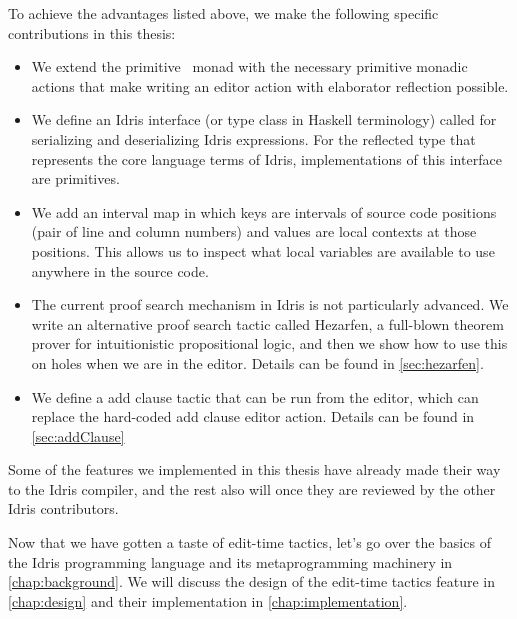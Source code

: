 To achieve the advantages listed above, we make the following specific
contributions in this thesis:
\begin{itemize}
\item We extend the primitive \Elab\ monad with the necessary primitive monadic
actions that make writing an editor action with elaborator reflection possible.
\item We define an Idris interface (or type class in Haskell terminology)
called  for serializing and deserializing Idris expressions.
For the reflected type that represents the core language terms of Idris,
implementations of this interface are primitives.
\item We add an interval map in which keys are intervals of source code
positions (pair of line and column numbers) and values are local contexts at
those positions. This allows us to inspect what local variables are available to
use anywhere in the source code.
\item The current proof search mechanism in Idris is not particularly advanced.
We write an alternative proof search tactic called Hezarfen, a full-blown
theorem prover for intuitionistic propositional logic, and then we show how
to use this on holes when we are in the editor.
Details can be found in \autoref{sec:hezarfen}.
\item We define a add clause tactic that can be run from the editor, which can
replace the hard-coded add clause editor action.
Details can be found in \autoref{sec:addClause}
\end{itemize}

Some of the features we implemented in this thesis have already made their way to
the Idris compiler, and the rest also will once they are reviewed by the
other Idris contributors.





Now that we have gotten a taste of edit-time tactics, let's go over the basics
of the Idris programming language and its metaprogramming machinery in
\autoref{chap:background}.
We will discuss the design of the edit-time tactics feature in
\autoref{chap:design} and their implementation in
\autoref{chap:implementation}.

